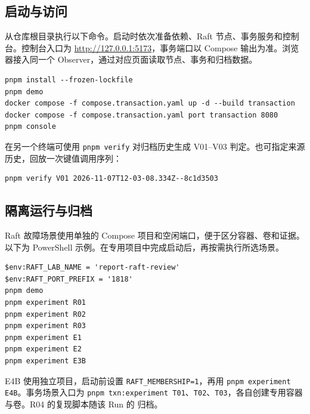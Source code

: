 \subsection{启动与访问}
从仓库根目录执行以下命令。启动时依次准备依赖、Raft 节点、事务服务和控制台。控制台入口为 \url{http://127.0.0.1:5173}，事务端口以 Compose 输出为准。浏览器接入同一个 Observer，通过对应页面读取节点、事务和归档数据。

\begin{lstlisting}
pnpm install --frozen-lockfile
pnpm demo
docker compose -f compose.transaction.yaml up -d --build transaction
docker compose -f compose.transaction.yaml port transaction 8080
pnpm console
\end{lstlisting}

在另一个终端可使用 \texttt{pnpm verify} 对归档历史生成 V01--V03 判定。也可指定来源历史，回放一次键值调用序列：

\begin{lstlisting}
pnpm verify V01 2026-11-07T12-03-08.334Z--8c1d3503
\end{lstlisting}

\subsection{隔离运行与归档}
Raft 故障场景使用单独的 Compose 项目和空闲端口，便于区分容器、卷和证据。以下为 PowerShell 示例。在专用项目中完成启动后，再按需执行所选场景。

\begin{lstlisting}
$env:RAFT_LAB_NAME = 'report-raft-review'
$env:RAFT_PORT_PREFIX = '1818'
pnpm demo
pnpm experiment R01
pnpm experiment R02
pnpm experiment R03
pnpm experiment E1
pnpm experiment E2
pnpm experiment E3B
\end{lstlisting}

E4B 使用独立项目，启动前设置 \texttt{RAFT\_MEMBERSHIP=1}，再用 \texttt{pnpm experiment E4B}。事务场景入口为 \texttt{pnpm txn:experiment T01}、\texttt{T02}、\texttt{T03}，各自创建专用容器与卷。R04 的复现脚本随该 Run 的  归档。


